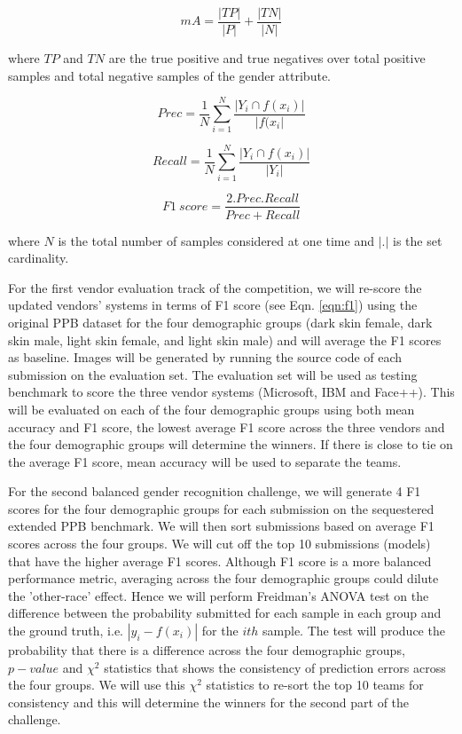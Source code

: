 \documentclass[11pt, oneside]{article}
\begin{document}
\begin{equation}
\label{eqn:ma}
mA =   \frac{|TP|}{|P|} + \frac{|TN|}{|N|}
\end{equation}

where $TP$ and $TN$ are the true positive and true negatives over total 
positive samples and total negative samples of the gender attribute.

\begin{equation}
\label{eqn:prec}
Prec =  \frac{1}{N}  \sum_{i=1}^{N}   \frac{|Y_{i} \cap f(x_{i}) |}{|f(x_{i}|}
\end{equation}

\begin{equation}
\label{eqn:rec}
Recall =  \frac{1}{N}  \sum_{i=1}^{N}   \frac{|Y_{i} \cap f(x_{i}) |}{|Y_{i}|}
\end{equation}

\begin{equation}
\label{eqn:f1}
F1\ score =  \frac{2.Prec.Recall}{Prec+Recall}
\end{equation}

where $N$ is the total number of samples considered at one time and $|.|$ is 
the set cardinality.

For the first vendor evaluation track of the competition, we will re-score the 
updated vendors' systems in terms of F1 score (see Eqn. \ref{eqn:f1}) using the 
original PPB dataset for the four demographic groups (dark skin female, dark 
skin male, light skin female, and light skin male) and will average the F1 
scores as baseline. Images will be generated by running the source code of each 
submission on the evaluation set.  The evaluation set will be used as testing 
benchmark to score the three vendor systems (Microsoft, IBM and Face++).  This 
will be evaluated on each of the four demographic groups using both mean 
accuracy and F1 score, the lowest average F1 score across the three vendors and 
the four demographic groups will determine the winners. If there is close to 
tie on the average F1 score, mean accuracy will be used to separate the teams.

For the second balanced gender recognition challenge, we will generate 4 F1 
scores for the four demographic groups for each submission on the sequestered 
extended PPB benchmark. We will then sort submissions based on average F1 
scores across the four groups. We will cut off the top 10 submissions (models) 
that have the higher average F1 scores. Although F1 score is a more balanced 
performance metric, averaging across the four demographic groups could dilute 
the 'other-race' effect. Hence we will perform Freidman's ANOVA test on the 
difference between the probability submitted for each sample in each group and 
the ground truth, i.e. $|y_{i} - f(x_{i})|$ for the $ith$ sample. The test will 
produce the probability that there is a difference across the four demographic 
groups, $p-value$ and $\chi^{2}$ statistics that shows the consistency of 
prediction errors across the four groups. We will use this $\chi^{2}$ 
statistics to re-sort the top 10 teams for consistency and this will determine 
the winners for the second part of the challenge.
\end{document}
